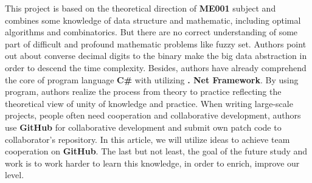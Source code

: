 This project is based on the theoretical direction of \textbf{ME001} subject and 
combines some knowledge of data structure and mathematic, 
including optimal algorithms and combinatorics. But there are no correct understanding of 
some part of difficult and profound mathematic problems like fuzzy set.
Authors point out about converse decimal digits to the binary make the big data abstraction in order to descend the time complexity.
Besides, authors have already comprehend the core of program language \textbf{C\#} 
with utilizing \textbf{. Net Framework}. By using program, authors realize the process 
from theory to practice reflecting the theoretical view of unity of knowledge and practice.
When writing large-scale projects, people often need cooperation and collaborative development, 
authors use \textbf{GitHub} for collaborative development and submit own patch code to collaborator's repository.
In this article, we will utilize ideas to achieve team cooperation on \textbf{GitHub}.
The last but not least, the goal of the future study and work is to work harder to learn this knowledge, 
in order to enrich, improve our level.
